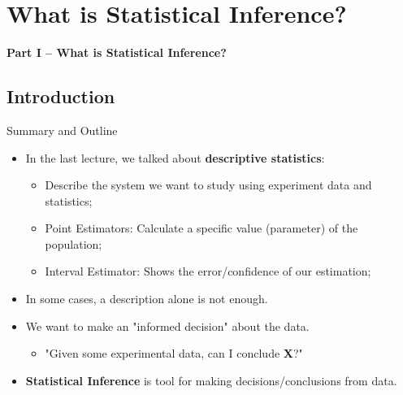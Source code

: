 \section{What is Statistical Inference?}

\begin{frame}
  \begin{center}
    {\bf Part I -- What is Statistical Inference?}
  \end{center}
\end{frame}

\subsection{Introduction}
\begin{frame}{Summary and Outline}
  \begin{itemize}
    \item In the last lecture, we talked about {\bf descriptive statistics}:
    \begin{itemize}
      \item Describe the system we want to study using experiment data and statistics;
      \item Point Estimators: Calculate a specific value (parameter) of the population;
      \item Interval Estimator: Shows the error/confidence of our estimation;
    \end{itemize}\bigskip

    \item In some cases, a description alone is not enough.
    \item We want to make an "informed decision" about the data.
    \begin{itemize}
      \item "Given some experimental data, can I conclude {\bf X}?"

    \end{itemize}\bigskip

    \item {\bf Statistical Inference} is tool for making decisions/conclusions from data.
  \end{itemize}
\end{frame}

